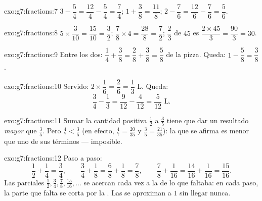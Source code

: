 \begin{solution}{exo:g7:fractions:7}
$3 - \dfrac54 = \dfrac{12}{4} - \dfrac54 = \dfrac74$; \quad
$1 + \dfrac38 = \dfrac{11}{8}$; \quad
$2 - \dfrac76 = \dfrac{12}{6} - \dfrac76 = \dfrac56$.
\end{solution}

\begin{solution}{exo:g7:fractions:8}
$5 \times \dfrac{3}{10} = \dfrac{15}{10} = \dfrac32$; \quad
$\dfrac78 \times 4 = \dfrac{28}{8} = \dfrac72$; \quad
$\dfrac23$ de $45$ es $\dfrac{2 \times 45}{3} = \dfrac{90}{3} = 30$.
\end{solution}

\begin{solution}{exo:g7:fractions:9}
Entre los dos: $\dfrac14 + \dfrac38 = \dfrac28 + \dfrac38 = \dfrac58$ de
la pizza. Queda: $1 - \dfrac58 = \dfrac38$.
\end{solution}

\begin{solution}{exo:g7:fractions:10}
Servido: $2 \times \dfrac16 = \dfrac26 = \dfrac13$ L. Queda:
\[
\frac34 - \frac13 = \frac{9}{12} - \frac{4}{12} = \frac{5}{12}
\text{ L}.
\]
\end{solution}

\begin{solution}{exo:g7:fractions:11}
Sumar la cantidad positiva $\frac12$ a $\frac35$ tiene que dar un resultado
\emph{mayor} que $\frac35$. Pero $\frac47 < \frac35$ (en efecto,
$\frac47 = \frac{20}{35}$ y $\frac35 = \frac{21}{35}$): la 
que se afirma es menor que uno de sus términos --- imposible.
\end{solution}

\begin{solution}{exo:g7:fractions:12}
Paso a paso:
\[
\frac12 + \frac14 = \frac34, \qquad
\frac34 + \frac18 = \frac68 + \frac18 = \frac78, \qquad
\frac78 + \frac1{16} = \frac{14}{16} + \frac1{16} = \frac{15}{16}.
\]
Las  parciales $\frac12, \frac34, \frac78, \frac{15}{16}, \dots$ se acercan
cada vez a la  de lo que faltaba: en cada paso, la parte que falta se
corta por la . Las  se aproximan a $1$ sin llegar nunca.
\end{solution}

